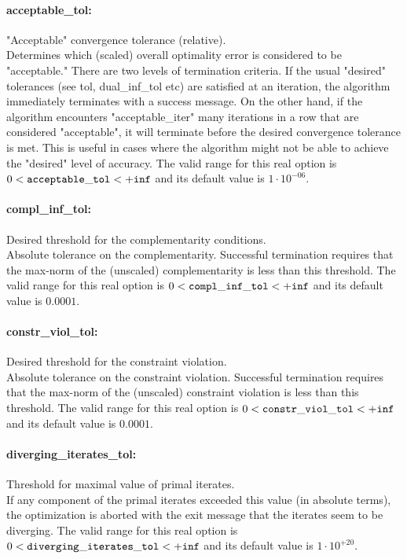 \paragraph{acceptable\_tol:}\label{opt:acceptable_tol} "Acceptable" convergence tolerance (relative). \\
 Determines which (scaled) overall optimality error is considered to be "acceptable." There are two levels of termination criteria.  If the usual "desired" tolerances (see tol, dual\_inf\_tol etc) are satisfied at an iteration, the algorithm immediately terminates with a success message.  On the other hand, if the algorithm encounters "acceptable\_iter" many iterations in a row that are considered "acceptable", it will terminate before the desired convergence tolerance is met. This is useful in cases where the algorithm might not be able to achieve the "desired" level of accuracy. The valid range for this real option is 
$0 <  {\tt acceptable\_tol } <  {\tt +inf}$
and its default value is $1 \cdot 10^{-06}$.


\paragraph{compl\_inf\_tol:}\label{opt:compl_inf_tol} Desired threshold for the complementarity conditions. \\
 Absolute tolerance on the complementarity. Successful termination requires that the max-norm of the (unscaled) complementarity is less than this threshold. The valid range for this real option is 
$0 <  {\tt compl\_inf\_tol } <  {\tt +inf}$
and its default value is $0.0001$.


\paragraph{constr\_viol\_tol:}\label{opt:constr_viol_tol} Desired threshold for the constraint violation. \\
 Absolute tolerance on the constraint violation. Successful termination requires that the max-norm of the (unscaled) constraint violation is less than this threshold. The valid range for this real option is 
$0 <  {\tt constr\_viol\_tol } <  {\tt +inf}$
and its default value is $0.0001$.


\paragraph{diverging\_iterates\_tol:}\label{opt:diverging_iterates_tol} Threshold for maximal value of primal iterates. \\
 If any component of the primal iterates exceeded this value (in absolute terms), the optimization is aborted with the exit message that the iterates seem to be diverging. The valid range for this real option is 
$0 <  {\tt diverging\_iterates\_tol } <  {\tt +inf}$
and its default value is $1 \cdot 10^{+20}$.


